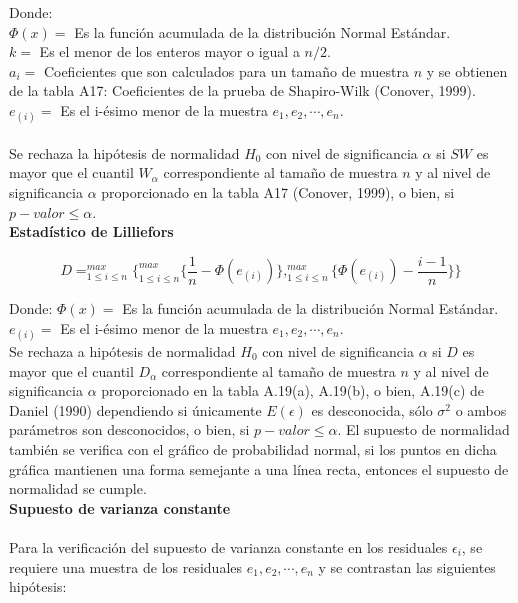 Donde:\\
$\Phi (x) =$ Es la función acumulada de la distribución Normal Estándar.\\
$k =$ Es el menor de los enteros mayor o igual a $n/2$.\\
$a_i =$ Coeficientes que son calculados para un tamaño de muestra $n$ y se obtienen de la tabla A17: Coeficientes de la prueba de Shapiro-Wilk (Conover, 1999).\\
$e_{(i)} =$ Es el i-ésimo menor de la muestra $e_1, e_2, \cdots , e_n$.\\\\
Se rechaza la hipótesis de normalidad $H_0$ con nivel de significancia $\alpha$ si $SW$ es mayor que el cuantil $W_{\alpha}$ correspondiente al tamaño de muestra $n$ y al nivel de significancia $\alpha$ proporcionado en la tabla A17 (Conover, 1999), o bien, si $p-valor \leq \alpha$.\\



\textbf{Estadístico de Lilliefors}

\begin{center}
	$$D = ^{max}_{1\leq i \leq n}\lbrace ^{max}_{1\leq i \leq n} \lbrace \frac{1}{n} - \Phi (e_{(i)}) \rbrace , ^{max}_{1 \leq i \leq n} \lbrace \Phi (e_{(i)}) - \frac{i-1}{n} \rbrace   \rbrace$$
\end{center}



Donde:
$\Phi (x) =$  Es la función acumulada de la distribución Normal Estándar.\\
$e_{(i)} =$ Es el i-ésimo menor de la muestra $e_1, e_2, \cdots , e_n$.\\

Se rechaza a hipótesis de normalidad $H_0$ con nivel de significancia $\alpha$ si $D$ es mayor que el cuantil $D_\alpha$ correspondiente al tamaño de muestra $n$ y al nivel de significancia $\alpha$ proporcionado en la tabla A.19(a), A.19(b), o bien, A.19(c) de Daniel (1990) dependiendo si únicamente $E(\epsilon)$ es desconocida, sólo $\sigma ^2$ o ambos parámetros son desconocidos, o bien, si $p-valor \leq \alpha$. El supuesto de normalidad también se verifica con el gráfico de probabilidad normal, si los puntos en dicha gráfica mantienen una forma semejante a una línea recta, entonces el supuesto de normalidad se cumple.\\



\textbf{Supuesto de varianza constante}\\\\
Para la verificación del supuesto de varianza constante en los residuales $\epsilon_i$, se requiere una muestra de los residuales $e_1, e_2, \cdots , e_n$ y se contrastan las siguientes hipótesis:\\

